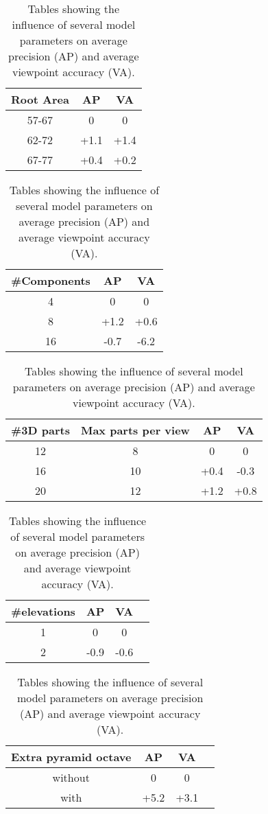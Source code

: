 \begin{table}[]
	\parbox{.45\linewidth}{
		\centering
		\begin{tabular}{|c|c|c|}
		\hline
		 Root Area & AP & VA \\
		\hline\hline
		 57-67 & 0 & 0  \\
		\hline 
		 62-72 & +1.1 & +1.4 \\
		\hline
		 67-77 & +0.4 & +0.2 \\
		\hline
		\end{tabular}
		\label{tab:rootarea}
	}		
	\parbox{.45\linewidth}{
		\centering
		\begin{tabular}{|c|c|c|}
		\hline
		 \#Components & AP & VA\\
		\hline\hline
		 4 & 0 & 0\\
		\hline 
		 8  & +1.2 & +0.6 \\
		 \hline 
		 16 & -0.7 & -6.2\\
		 \hline
		\end{tabular}
		\label{tab:numComp}
	}		
	\parbox{\linewidth}{
		\centering
		\begin{tabular}{|c|c|c|c|}
		\hline
		 \#3D parts & Max parts per view & AP & VA\\
		\hline\hline
		 12 & 8 & 0  & 0\\
		\hline 
		 16 & 10 & +0.4 & -0.3\\
		 \hline 
		 20 & 12 & +1.2 & +0.8\\
		 \hline
		\end{tabular}
		\label{tab:parts}
	}	
	\parbox{.5\linewidth}{
		\centering
		\begin{tabular}{|c|c|c|c|}
		\hline
		 \#elevations & AP & VA\\
		\hline\hline
		 1 & 0  & 0\\
		\hline 
		 2 & -0.9 & -0.6\\
		 \hline 
		\end{tabular}
		\label{tab:elev}
	}
	\parbox{.5\linewidth}{
		\centering
		\begin{tabular}{|c|c|c|c|}
		\hline
		 Extra pyramid octave & AP & VA\\
		\hline\hline
		 without & 0  & 0\\
		\hline 
		 with & +5.2 & +3.1\\
		 \hline 
		\end{tabular}
		\label{tab:extraoctave}
	}
	\caption{Tables showing the influence of several model parameters on average precision (AP) and average viewpoint accuracy (VA).}
	\label{tab:modelParam}
\end{table}
